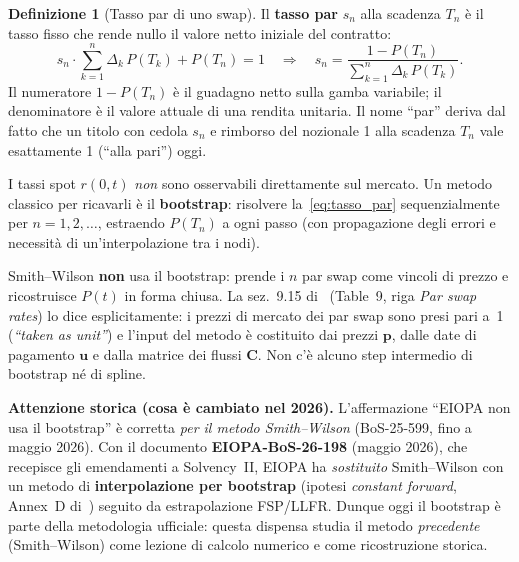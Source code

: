 \documentclass[11pt,a4paper]{article}
\theoremstyle{plain}
\theoremstyle{definition}
\newtheorem{definizione}[teorema]{Definizione}
\theoremstyle{remark}
\newcommand{\bfp}{\mathbf{p}}
\newcommand{\bfu}{\mathbf{u}}
\newcommand{\Cmat}{\mathbf{C}}
\begin{document}
\begin{definizione}[Tasso par di uno swap]
Il \textbf{tasso par} $s_n$ alla scadenza $T_n$ \`e il tasso fisso che
rende nullo il valore netto iniziale del contratto:
\begin{equation}
  \label{eq:tasso_par}
  s_n \cdot \sum_{k=1}^{n} \Delta_k\,P(T_k) + P(T_n) = 1
  \quad\Longrightarrow\quad
  s_n = \frac{1 - P(T_n)}{\displaystyle\sum_{k=1}^{n} \Delta_k\,P(T_k)}.
\end{equation}
Il numeratore $1-P(T_n)$ \`e il guadagno netto sulla gamba variabile;
il denominatore \`e il valore attuale di una rendita unitaria.
Il nome ``par'' deriva dal fatto che un titolo con cedola $s_n$ e rimborso
del nozionale 1 alla scadenza $T_n$ vale esattamente 1 (``alla pari'') oggi.
\end{definizione}

\begin{keybox}
I tassi spot $r(0,t)$ \emph{non} sono osservabili direttamente sul mercato.
Un metodo classico per ricavarli è il \textbf{bootstrap}: risolvere
la~\eqref{eq:tasso_par} sequenzialmente per $n=1,2,\ldots$, estraendo $P(T_n)$ a
ogni passo (con propagazione degli errori e necessità di un'interpolazione tra i nodi).

Smith--Wilson \textbf{non} usa il bootstrap: prende i $n$ par swap come vincoli di
prezzo e ricostruisce $P(t)$ in forma chiusa. La sez.~9.15 di~\cite{eiopa2025}
(Table~9, riga \emph{Par swap rates}) lo dice esplicitamente: i prezzi di mercato
dei par swap sono presi pari a~1 (\emph{``taken as unit''}) e l'input del metodo è
costituito dai prezzi $\bfp$, dalle date di pagamento $\bfu$ e dalla matrice dei
flussi $\Cmat$. Non c'è alcuno step intermedio di bootstrap né di spline.
\end{keybox}

\begin{warningbox}
\textbf{Attenzione storica (cosa è cambiato nel 2026).} L'affermazione
``EIOPA non usa il bootstrap'' è corretta \emph{per il metodo Smith--Wilson}
(BoS-25-599, fino a maggio 2026). Con il documento \textbf{EIOPA-BoS-26-198}
(maggio 2026), che recepisce gli emendamenti a Solvency~II, EIOPA ha
\emph{sostituito} Smith--Wilson con un metodo di \textbf{interpolazione per
bootstrap} (ipotesi \emph{constant forward}, Annex~D di~\cite{eiopa2026})
seguito da estrapolazione FSP/LLFR. Dunque oggi il bootstrap è parte della
metodologia ufficiale: questa dispensa studia il metodo \emph{precedente}
(Smith--Wilson) come lezione di calcolo numerico e come ricostruzione storica.
\end{warningbox}
\end{document}
